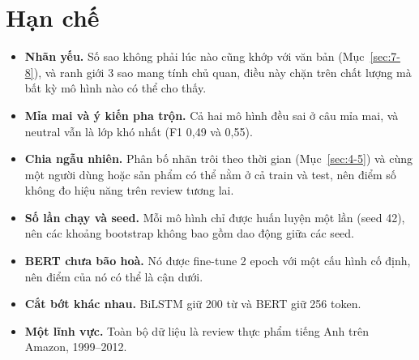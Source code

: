 \section{Hạn chế}
\label{sec:7-9}

\begin{itemize}
    \item \textbf{Nhãn yếu.} Số sao không phải lúc nào cũng khớp với văn bản (Mục~\ref{sec:7-8}), và ranh giới 3 sao mang tính chủ quan, điều này chặn trên chất lượng mà bất kỳ mô hình nào có thể cho thấy.
    \item \textbf{Mỉa mai và ý kiến pha trộn.} Cả hai mô hình đều sai ở câu mỉa mai, và neutral vẫn là lớp khó nhất (F1 0,49 và 0,55).
    \item \textbf{Chia ngẫu nhiên.} Phân bố nhãn trôi theo thời gian (Mục~\ref{sec:4-5}) và cùng một người dùng hoặc sản phẩm có thể nằm ở cả train và test, nên điểm số không đo hiệu năng trên review tương lai.
    \item \textbf{Số lần chạy và seed.} Mỗi mô hình chỉ được huấn luyện một lần (seed 42), nên các khoảng bootstrap không bao gồm dao động giữa các seed.
    \item \textbf{BERT chưa bão hoà.} Nó được fine-tune 2 epoch với một cấu hình cố định, nên điểm của nó có thể là cận dưới.
    \item \textbf{Cắt bớt khác nhau.} BiLSTM giữ 200 từ và BERT giữ 256 token.
    \item \textbf{Một lĩnh vực.} Toàn bộ dữ liệu là review thực phẩm tiếng Anh trên Amazon, 1999--2012.
\end{itemize}
